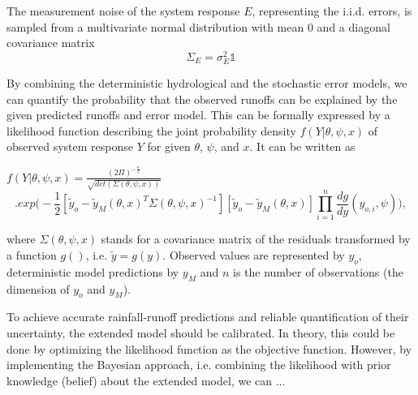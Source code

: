 \documentclass{ctuthesis}\usepackage[]{graphicx}\usepackage[]{color}
\begin{document}
The measurement noise of the system response $E$, representing the i.i.d. errors, is sampled from a multivariate normal distribution with mean 0 and a diagonal covariance matrix
\begin{equation}
\Sigma_E= \sigma_E^2 \mathds{1}
\end{equation}

By combining the deterministic hydrological and the stochastic error models, we can quantify the probability that the observed runoffs can be explained by the given predicted runoffs and error model. This can be formally expressed by a likelihood function describing the joint probability density $f(Y|\theta, \psi, x)$ of observed system response $Y$ for given $\theta$, $\psi$, and $x$. It can be written as

$ f (Y|\theta, \psi, x) = \frac{(2\Pi)^{-\frac{n}{2}}}{\sqrt{det(\Sigma(\theta, \psi, x))}} $
\begin{equation}
. exp \Big( -\frac{1}{2}  [ \tilde{y}_{o} - \tilde{y}_{M}(\theta, x)^{T}  \Sigma(\theta, \psi, x)^{-1} ]  [ \tilde{y}_{o} - \tilde{y}_{M}(\theta, x)]  \prod^{n}_{i=1} \frac{dg}{dy} (y_{o,i},\psi) \Big),
\end{equation}

where $\Sigma(\theta, \psi, x)$ stands for a covariance matrix of the residuals transformed by a function $g()$, i.e. $\tilde{y}=g(y)$. Observed values are represented by $y_{o}$, deterministic model predictions by $y_{M}$ and $n$ is the number of observations (the dimension of $y_{o}$ and $y_{M}$).


To achieve accurate rainfall-runoff predictions and reliable quantification of their uncertainty, the extended model should be calibrated. In theory, this could be done by optimizing the likelihood function as the objective function. However, by implementing the Bayesian approach, i.e. combining the likelihood with prior knowledge (belief) about the extended model, we can ...
\end{document}
